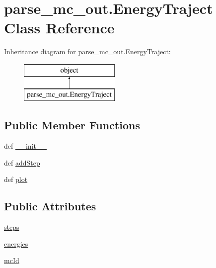 \hypertarget{classparse__mc__out_1_1_energy_traject}{\section{parse\-\_\-mc\-\_\-out.\-Energy\-Traject Class Reference}
\label{classparse__mc__out_1_1_energy_traject}
}
Inheritance diagram for parse\-\_\-mc\-\_\-out.\-Energy\-Traject\-:\begin{figure}[H]
\begin{center}
\leavevmode
\includegraphics[height=2.000000cm]{classparse__mc__out_1_1_energy_traject}
\end{center}
\end{figure}
\subsection*{Public Member Functions}
\begin{DoxyCompactItemize}
\item 
def \hyperlink{classparse__mc__out_1_1_energy_traject_a12f6574577648b4370fdc0f24f253d67}{\-\_\-\-\_\-init\-\_\-\-\_\-}
\item 
def \hyperlink{classparse__mc__out_1_1_energy_traject_af68bcdb88e803e16948cb805b744ba2e}{add\-Step}
\item 
def \hyperlink{classparse__mc__out_1_1_energy_traject_a051802c7c03d2d06f03ff784627f14fa}{plot}
\end{DoxyCompactItemize}
\subsection*{Public Attributes}
\begin{DoxyCompactItemize}
\item 
\hyperlink{classparse__mc__out_1_1_energy_traject_a827f43a08531e3bd0b1e51e216a06a9c}{steps}
\item 
\hyperlink{classparse__mc__out_1_1_energy_traject_afec19ac593c5be2a29167a6ec21b951f}{energies}
\item 
\hyperlink{classparse__mc__out_1_1_energy_traject_a5dd33d48943a8013e66d012e0fd408fc}{mc\-Id}
\end{DoxyCompactItemize}


